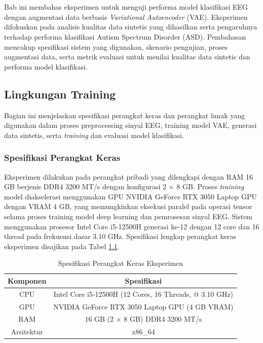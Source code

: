 \chapter{\babEmpat}

Bab ini membahas eksperimen untuk menguji performa model klasifikasi EEG dengan augmentasi data berbasis \textit{Variational Autoencoder} (VAE). Eksperimen difokuskan pada analisis kualitas data sintetis yang dihasilkan serta pengaruhnya terhadap performa klasifikasi Autism Spectrum Disorder (ASD). Pembahasan mencakup spesifikasi sistem yang digunakan, skenario pengujian, proses augmentasi data, serta metrik evaluasi untuk menilai kualitas data sintetis dan performa model klasifikasi.

\section{Lingkungan Training}
Bagian ini menjelaskan spesifikasi perangkat keras dan perangkat lunak yang digunakan dalam proses preprocessing sinyal EEG, training model VAE, generasi data sintetis, serta \textit{training} dan evaluasi model klasifikasi.

\subsection{Spesifikasi Perangkat Keras}
Eksperimen dilakukan pada perangkat pribadi yang dilengkapi dengan RAM 16 GB berjenis DDR4 3200 MT/s dengan konfigurasi 2 $\times$ 8 GB. Proses \textit{training} model diakselerasi menggunakan GPU NVIDIA GeForce RTX 3050 Laptop GPU dengan VRAM 4 GB, yang memungkinkan eksekusi paralel pada operasi tensor selama proses training model deep learning dan pemrosesan sinyal EEG. Sistem menggunakan prosesor Intel Core i5-12500H generasi ke-12 dengan 12 core dan 16 thread pada frekuensi dasar 3.10 GHz. Spesifikasi lengkap perangkat keras eksperimen disajikan pada Tabel \ref{tab:hardware-spec}.\begin{table}[H]
\centering
\footnotesize
\caption{Spesifikasi Perangkat Keras Eksperimen}
\label{tab:hardware-spec}
\begin{tabular}{|c|c|}
\hline
\textbf{Komponen} & \textbf{Spesifikasi} \\
\hline
CPU & Intel Core i5-12500H (12 Cores, 16 Threads, @ 3.10 GHz) \\
\hline
GPU & NVIDIA GeForce RTX 3050 Laptop GPU (4 GB VRAM) \\
\hline
RAM & 16 GB (2 $\times$ 8 GB) DDR4 3200 MT/s \\
\hline
Arsitektur & x86\_64 \\
\hline
\end{tabular}
\end{table} 
